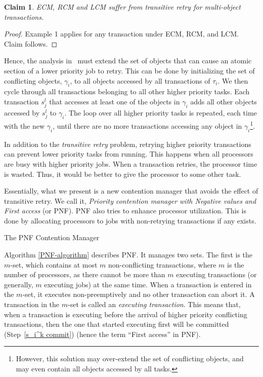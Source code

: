 \documentclass[twocolumn]{article}
\makeatletter
\def\section{\@startsection {section}{1}{\z@}{20pt plus 2pt minus 2pt}
{8pt plus 2pt minus 2pt}{\centering\normalsize\sc
\edef\@svsec{\thesection.\ }}}
\def\thesection{\Roman{section}}
\newtheorem{clm}{Claim}
\newtheorem{proof}{Proof}
\makeatother
\begin{document}
\begin{clm}\label{ecm-rcm-transitive-retry}
ECM, RCM and LCM suffer from transitive retry for multi-object transactions.
\end{clm}
\begin{proof}\normalfont
Example 1 applies for any transaction under ECM, RCM, and LCM. Claim follows.
\end{proof}
Hence, the analysis in~\cite{stmconcurrencycontrol:emsoft11,lcmdac2012} must extend the set of objects that can cause an atomic section of a lower priority job to retry.  This can be done by initializing the set of conflicting objects, $\gamma_i$, to all objects accessed by all transactions of $\tau_i$. We then cycle through all transactions belonging to all other higher priority tasks. Each transaction $s_j^l$ that accesses at least one of the objects in $\gamma_i$ adds all other objects accessed by $s_j^l$ to $\gamma_i$. The loop over all higher priority tasks is repeated, each time with the new $\gamma_i$, until there are no more transactions accessing any object in $\gamma_i$\footnote{However, this solution may over-extend the set of conflicting objects, and may even contain all objects accessed by all tasks.}.

In addition to the \emph{transitive retry} problem, retrying higher priority transactions can prevent lower priority tasks from running. This happens when all processors are busy with higher priority jobs. When a transaction retries, the processor time is wasted. Thus, it would be better to give the processor to some other task.

Essentially, what we present is a new contention manager that avoids the effect of transitive retry. We call it, \textit{Priority contention manager with Negative values and First access} (or PNF). PNF also tries to enhance processor utilization. This is done by allocating processors to jobs with non-retrying transactions if any exists. 

\section{The PNF Contention Manager\label{PNF}}

Algorithm \ref{PNF-algorithm} describes PNF. It
manages two sets. The first is the $m$-set, which contains at most $m$ non-conflicting
transactions, where $m$ is the number of processors, as
there cannot be more than $m$ executing transactions (or generally,
$m$ executing jobs) at the same time. When a transaction is entered
in the $m$-set, it executes non-preemptively and no other transaction
can abort it. A transaction in the $m$-set is called an \emph{executing
transaction}. 
This means that, when a transaction is executing before
the arrival of higher priority conflicting transactions, then the
one that started executing first will be committed (Step~\ref{s_i^k commit}) (hence the term ``First access'' in PNF).
\end{document}
